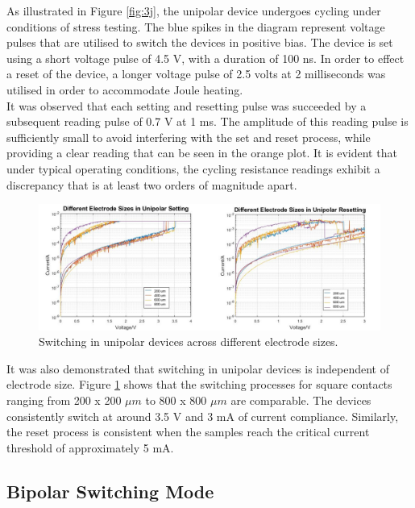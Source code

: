 \noindent As illustrated in Figure \ref{fig:3j}, the unipolar device undergoes cycling under conditions of stress testing. The blue spikes in the diagram represent voltage pulses that are utilised to switch the devices in positive bias. The device is set using a short voltage pulse of 4.5 V, with a duration of 100 ns. In order to effect a reset of the device, a longer voltage pulse of 2.5 volts at 2 milliseconds was utilised in order to accommodate Joule heating. \\

\noindent It was observed that each setting and resetting pulse was succeeded by a subsequent reading pulse of 0.7 V at 1 ms. The amplitude of this reading pulse is sufficiently small to avoid interfering with the set and reset process, while providing a clear reading that can be seen in the orange plot. It is evident that under typical operating conditions, the cycling resistance readings exhibit a discrepancy that is at least two orders of magnitude apart.\\

\begin{figure}[htbp!] 
    \centering    
    \includegraphics[width=1\textwidth]{Chapter3/Figs/k.png}
    \caption[Switching in unipolar devices across different electrode sizes.]{Switching in unipolar devices across different electrode sizes.}
    \label{fig:3k}
\end{figure}

\noindent It was also demonstrated that switching in unipolar devices is independent of electrode size. Figure \ref{fig:3k} shows that the switching processes for square contacts ranging from 200 x 200 $\mu m$ to 800 x 800 $\mu m$ are comparable. The devices consistently switch at around 3.5 V and 3 mA of current compliance. Similarly, the reset process is consistent when the samples reach the critical current threshold of approximately 5 mA.

\subsection[Bipolar Switching Mode]{Bipolar Switching Mode}

